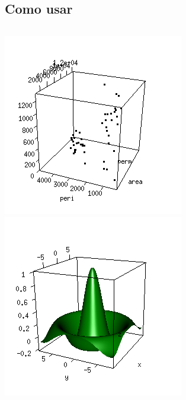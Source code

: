 \subsection{Como usar}

\begin{frame}
  \begin{columns}
    \includegraphics[width=\linewidth]{./images/fig3d-1.png}\\
    \includegraphics[width=\linewidth]{./images/fig3d-2.png}
  \end{columns}
\end{frame}


